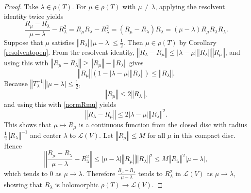 \documentclass{article}
\newcommand{\norm}[1]{\left\Vert #1 \right\Vert}
\theoremstyle{definition}
\begin{document}
\begin{proof}
Take $\lambda \in \rho(T)$. For $\mu \in \rho(T)$ with 
 $\mu \neq \lambda$, applying the resolvent identity twice yields
\[
\frac{R_\mu-R_\lambda}{\mu-\lambda} - R_\lambda^2
=R_\mu R_\lambda - R_\lambda^2 = 
(R_\mu-R_\lambda)R_\lambda = (\mu-\lambda)R_\mu R_\lambda R_\lambda.
\]
Suppose that $\mu$ satisfies 
$\norm{R_\lambda} |\mu - \lambda| \leq \frac{1}{2}$.
Then $\mu \in \rho(T)$ by Corollary \ref{resolventopen}. From the resolvent identity,
$\norm{R_\lambda-R_\mu} \leq |\lambda-\mu| \norm{R_\lambda} \norm{R_\mu}$, and using this with
$\norm{R_\mu-R_\lambda} \geq \norm{R_\mu}-\norm{R_\lambda}$ gives
\begin{equation}
\norm{R_\mu} (1-|\lambda-\mu| \norm{R_\lambda}) \leq \norm{R_\lambda}.
\label{normRmu}
\end{equation}
Because $\norm{T_\lambda^{-1}} |\mu - \lambda| \leq \frac{1}{2}$, 
\[
\norm{R_\mu} \leq 2\norm{R_\lambda},
\]
and using this with \eqref{normRmu} yields
\[
\norm{R_\lambda-R_\mu} \leq 2|\lambda-\mu| \norm{R_\lambda}^2.
\]
This shows that $\mu \mapsto R_\mu$ is a continuous function from the closed disc with radius $\frac{1}{2} \norm{R_\lambda}^{-1}$
and center $\lambda$ to $\mathscr{L}(V)$. Let $\norm{R_\mu} \leq M$ for all $\mu$ in this compact disc. 
Hence
\[
\norm{\frac{R_\mu-R_\lambda}{\mu-\lambda} - R_\lambda^2} \leq |\mu-\lambda| \norm{R_\mu} \norm{R_\lambda}^2
\leq M\norm{R_\lambda}^2 |\mu-\lambda|,
\]
which tends to $0$ as $\mu \to \lambda$. Therefore $\frac{R_\mu-R_\lambda}{\mu-\lambda}$ tends
to $R_\lambda^2$ in $\mathscr{L}(V)$ as $\mu \to \lambda$, showing that $R_\lambda$
is holomorphic $\rho(T) \to \mathscr{L}(V)$. 
\end{proof}
\end{document}
